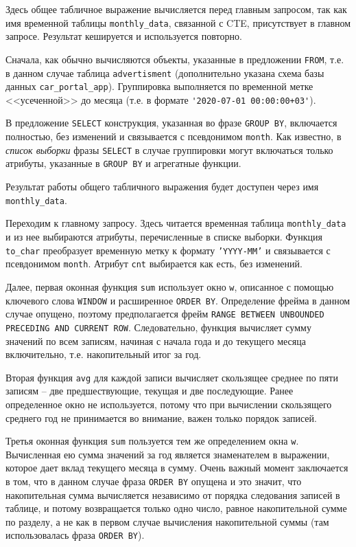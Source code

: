 \documentclass[%
	11pt,
	a4paper,
	utf8,
		]{article}
\begin{document}
Здесь общее табличное выражение вычисляется перед главным запросом, так как имя временной таблицы \texttt{monthly\_data}, связанной с CTE, присутствует в главном запросе. Результат кешируется и используется повторно.

Сначала, как обычно вычисляются объекты, указанные в предложении \texttt{FROM}, т.е. в данном случае таблица \texttt{advertisment} (дополнительно указана схема базы данных \texttt{car\_portal\_app}). Группировка выполняется по временной метке <<усеченной>> до месяца (т.е. в формате \lstinline{'2020-07-01 00:00:00+03'}).

В предложение \texttt{SELECT} конструкция, указанная во фразе \texttt{GROUP BY}, включается полностью, без изменений и связывается с псевдонимом \texttt{month}. Как известно, в \emph{список выборки} фразы \texttt{SELECT} в случае группировки могут включаться только атрибуты, указанные в \texttt{GROUP BY} и агрегатные функции.

Результат работы общего табличного выражения будет доступен через имя \texttt{monthly\_data}.

Переходим к главному запросу. Здесь читается временная таблица \texttt{monthly\_data} и из нее выбираются атрибуты, перечисленные в списке выборки. Функция \texttt{to\_char} преобразует временную метку к формату \texttt{'YYYY-MM'} и связывается с псевдонимом \texttt{month}. Атрибут \texttt{cnt} выбирается как есть, без изменений.

Далее, первая оконная функция \texttt{sum} использует окно \texttt{w}, описанное с помощью ключевого слова \texttt{WINDOW} и расширенное \texttt{ORDER BY}. Определение фрейма в данном случае опущено, поэтому предполагается фрейм \texttt{RANGE BETWEEN UNBOUNDED PRECEDING AND CURRENT ROW}. Следовательно, функция вычисляет сумму значений по всем записям, начиная с начала года и до текущего месяца включительно, т.е. накопительный итог за год.

Вторая функция \texttt{avg} для каждой записи вычисляет скользящее среднее по пяти записям -- две предшествующие, текущая и две последующие. Ранее определенное окно не используется, потому что при вычислении скользящего среднего год не принимается во внимание, важен только порядок записей.

Третья оконная функция \texttt{sum} пользуется тем же определением окна \texttt{w}. Вычисленная ею сумма значений за год является знаменателем в выражении, которое дает вклад текущего месяца в сумму. Очень важный момент заключается в том, что в данном случае фраза \texttt{ORDER BY} опущена и это значит, что накопительная сумма вычисляется независимо от порядка следования записей в таблице, и потому возвращается только одно число, равное накопительной сумме по разделу, а не как в первом случае вычисления накопительной суммы (там использовалась фраза \texttt{ORDER BY}).
\end{document}
